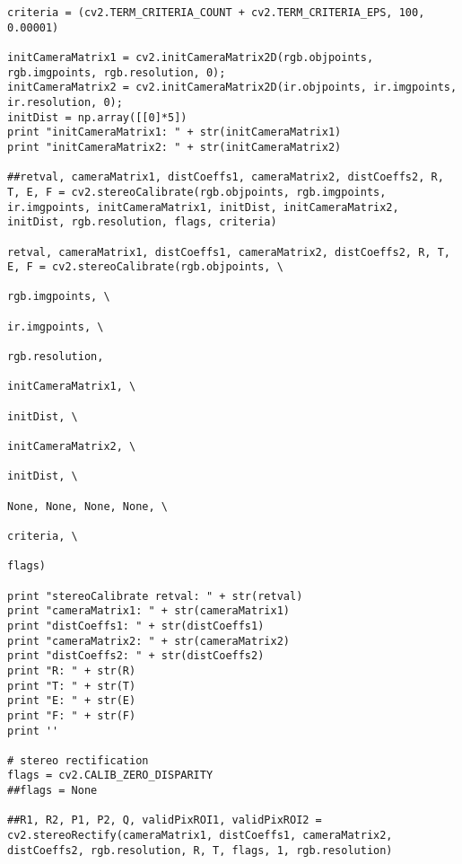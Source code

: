 \begin{appendices}
\begin{lstlisting}
criteria = (cv2.TERM_CRITERIA_COUNT + cv2.TERM_CRITERIA_EPS, 100, 0.00001)

initCameraMatrix1 = cv2.initCameraMatrix2D(rgb.objpoints, rgb.imgpoints, rgb.resolution, 0);
initCameraMatrix2 = cv2.initCameraMatrix2D(ir.objpoints, ir.imgpoints, ir.resolution, 0);
initDist = np.array([[0]*5])
print "initCameraMatrix1: " + str(initCameraMatrix1)
print "initCameraMatrix2: " + str(initCameraMatrix2)
    
##retval, cameraMatrix1, distCoeffs1, cameraMatrix2, distCoeffs2, R, T, E, F = cv2.stereoCalibrate(rgb.objpoints, rgb.imgpoints, ir.imgpoints, initCameraMatrix1, initDist, initCameraMatrix2, initDist, rgb.resolution, flags, criteria)

retval, cameraMatrix1, distCoeffs1, cameraMatrix2, distCoeffs2, R, T, E, F = cv2.stereoCalibrate(rgb.objpoints, \
                                                                                                 rgb.imgpoints, \
                                                                                                 ir.imgpoints, \
                                                                                                 rgb.resolution,
                                                                                                 initCameraMatrix1, \
                                                                                                 initDist, \
                                                                                                 initCameraMatrix2, \
                                                                                                 initDist, \
                                                                                                 None, None, None, None, \
                                                                                                 criteria, \
                                                                                                 flags)

print "stereoCalibrate retval: " + str(retval)
print "cameraMatrix1: " + str(cameraMatrix1)
print "distCoeffs1: " + str(distCoeffs1)
print "cameraMatrix2: " + str(cameraMatrix2)
print "distCoeffs2: " + str(distCoeffs2)
print "R: " + str(R)
print "T: " + str(T)
print "E: " + str(E)
print "F: " + str(F)
print ''

# stereo rectification
flags = cv2.CALIB_ZERO_DISPARITY
##flags = None

##R1, R2, P1, P2, Q, validPixROI1, validPixROI2 = cv2.stereoRectify(cameraMatrix1, distCoeffs1, cameraMatrix2, distCoeffs2, rgb.resolution, R, T, flags, 1, rgb.resolution)


\end{lstlisting}
\end{appendices}
